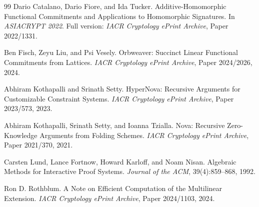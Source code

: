 \documentclass[11pt]{article}
\begin{document}
\begin{thebibliography}{99}
Dario Catalano, Dario Fiore, and Ida Tucker.
\newblock Additive-Homomorphic Functional Commitments and Applications to Homomorphic Signatures.
\newblock In \emph{ASIACRYPT 2022}. Full version: \emph{IACR Cryptology ePrint Archive}, Paper 2022/1331.

Ben Fisch, Zeyu Liu, and Psi Vesely.
\newblock Orbweaver: Succinct Linear Functional Commitments from Lattices.
\newblock \emph{IACR Cryptology ePrint Archive}, Paper 2024/2026, 2024.

Abhiram Kothapalli and Srinath Setty.
\newblock HyperNova: Recursive Arguments for Customizable Constraint Systems.
\newblock \emph{IACR Cryptology ePrint Archive}, Paper 2023/573, 2023.

Abhiram Kothapalli, Srinath Setty, and Ioanna Tzialla.
\newblock Nova: Recursive Zero-Knowledge Arguments from Folding Schemes.
\newblock \emph{IACR Cryptology ePrint Archive}, Paper 2021/370, 2021.

Carsten Lund, Lance Fortnow, Howard Karloff, and Noam Nisan.
\newblock Algebraic Methods for Interactive Proof Systems.
\newblock \emph{Journal of the ACM}, 39(4):859--868, 1992.

Ron D. Rothblum.
\newblock A Note on Efficient Computation of the Multilinear Extension.
\newblock \emph{IACR Cryptology ePrint Archive}, Paper 2024/1103, 2024.

\end{thebibliography}
\end{document}
